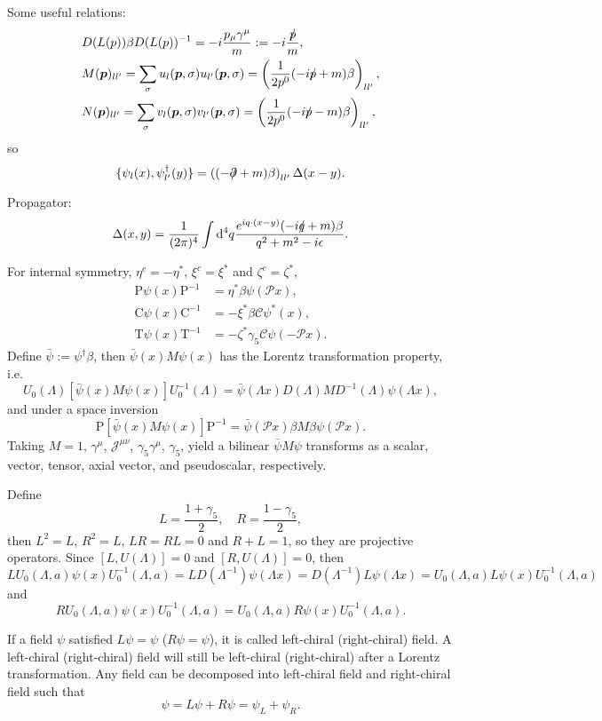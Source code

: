 \documentclass[10pt]{article}
\begin{document}
Some useful relations:
\[
\begin{split}
	&D(L(p))\beta D(L(p))^{-1}=-i\frac{p_\mu \gamma^\mu}{m}:=-i\frac{\mynot p}{m},\\
	&M(\bm{p})_{ll'}=\sum_{\sigma}u_l(\bm{p},\sigma)u_{l'}(\bm{p},\sigma)=\left(\frac{1}{2p^0}(-i\mynot p+m)\beta\right)_{ll'},\\
	&N(\bm{p})_{ll'}=\sum_{\sigma}v_l(\bm{p},\sigma)v_{l'}(\bm{p},\sigma)=\left(\frac{1}{2p^0}(-i\mynot p-m)\beta\right)_{ll'},
\end{split}
\]
so
\[
	\{\psi_l(x),\psi_{l'}^\dag (y)\}=\left((-\partial\!\!\!/+m)\beta\right)_{ll'}\Delta(x-y).
\]

Propagator:
\[
	\Delta(x,y)=\frac{1}{(2\pi)^4}\int \mathrm{d}^4q \frac{e^{iq\cdot (x-y)}(-iq\!\!\!/+m)\beta}{q^2+m^2-i\epsilon}.
\]

For internal symmetry, $\eta^c=-\eta^*$, $\xi^c=\xi^*$ and $\zeta^c=\zeta^*$,
\[
\begin{split}
	\mathrm{P}\psi(x)\mathrm{P}^{-1}&=\eta^*\beta\psi(\mathscr{P}x),\\
	\mathrm{C}\psi(x)\mathrm{C}^{-1}&=-\xi^*\beta\mathscr{C}\psi^*(x),\\
	\mathrm{T}\psi(x)\mathrm{T}^{-1}&=-\zeta^*\gamma_5\mathscr{C}\psi(-\mathscr{P}x).
\end{split}
\]
Define $\bar{\psi}:=\psi^{\dag}\beta$, then $\bar{\psi}(x)M \psi(x)$ has the Lorentz transformation property, i.e.
\[
	U_0(\Lambda)[\bar{\psi}(x)M \psi(x)]U_0^{-1}(\Lambda)=\bar{\psi}(\Lambda x)D(\Lambda) M D^{-1}(\Lambda)\psi(\Lambda x),
\]
and under a space inversion
\[
	\mathrm{P}[\bar{\psi}(x)M \psi(x)]\mathrm{P}^{-1}=\bar{\psi}(\mathscr{P}x)\beta M\beta \psi(\mathscr{P}x).
\]
Taking $M=1$, $\gamma^\mu$, $\mathscr{J}^{\mu\nu}$, $\gamma_5\gamma^\mu$, $\gamma_5$, yield a bilinear $\bar{\psi}M \psi$ transforms as a scalar, vector, tensor, axial vector, and pseudoscalar, respectively.

Define 
\[
	L=\frac{1+\gamma_5}{2},\quad R=\frac{1-\gamma_5}{2},
\]
then $L^2=L$, $R^2=L$, $LR=RL=0$ and $R+L=1$, so they are projective operators. Since $[L,U(\Lambda)]=0$ and $[R,U(\Lambda)]=0$, then
\[
	LU_0(\Lambda,a)\psi(x)U_0^{-1}(\Lambda,a)=LD(\Lambda^{-1})\psi(\Lambda x)=D(\Lambda^{-1})L\psi(\Lambda x)=U_0(\Lambda,a)L\psi(x)U_0^{-1}(\Lambda,a)
\]
and
\[
	RU_0(\Lambda,a)\psi(x)U_0^{-1}(\Lambda,a)=U_0(\Lambda,a)R\psi(x)U_0^{-1}(\Lambda,a).
\]

If a field $\psi$ satisfied $L\psi=\psi$ ($R\psi=\psi$), it is called left-chiral (right-chiral) field. A left-chiral (right-chiral) field will still be left-chiral (right-chiral) after a Lorentz transformation. Any field can be decomposed into left-chiral field and right-chiral field such that
\[
	\psi=L\psi+R\psi=\psi_L+\psi_R.
\]
\end{document}
